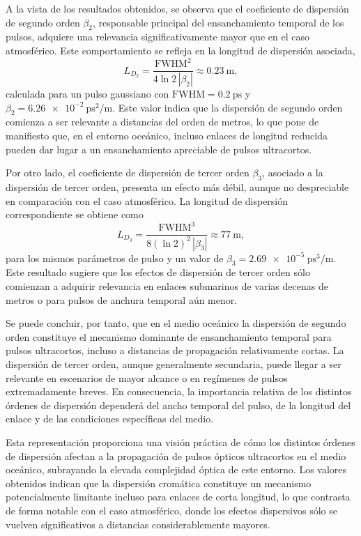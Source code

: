 A la vista de los resultados obtenidos, se observa que el coeficiente de dispersión de segundo orden $\beta_{2}$, responsable principal del ensanchamiento temporal de los pulsos, adquiere una relevancia significativamente mayor que en el caso atmosférico. Este comportamiento se refleja en la longitud de dispersión asociada,
\begin{equation}
L_{D_2}=\frac{\mathrm{FWHM}^2}{4\ln 2\,|\beta_{2}|}\approx \SI{0.23}{\meter},
\end{equation}
calculada para un pulso gaussiano con $\mathrm{FWHM}=\SI{0.2}{\pico\second}$ y $\beta_2=\SI{6.26e-2}{\pico\second\squared\per\meter}$. Este valor indica que la dispersión de segundo orden comienza a ser relevante a distancias del orden de metros, lo que pone de manifiesto que, en el entorno oceánico, incluso enlaces de longitud reducida pueden dar lugar a un ensanchamiento apreciable de pulsos ultracortos.

Por otro lado, el coeficiente de dispersión de tercer orden $\beta_{3}$, asociado a la dispersión de tercer orden, presenta un efecto más débil, aunque no despreciable en comparación con el caso atmosférico. La longitud de dispersión correspondiente se obtiene como
\begin{equation}
L_{D_3}=\frac{\mathrm{FWHM}^3}{8(\ln 2)^2\,|\beta_{3}|}\approx \SI{77}{\meter},
\end{equation}
para los mismos parámetros de pulso y un valor de $\beta_3=\SI{2.69e-5}{\pico\second\cubed\per\meter}$. Este resultado sugiere que los efectos de dispersión de tercer orden sólo comienzan a adquirir relevancia en enlaces submarinos de varias decenas de metros o para pulsos de anchura temporal aún menor.

Se puede concluir, por tanto, que en el medio oceánico la dispersión de segundo orden constituye el mecanismo dominante de ensanchamiento temporal para pulsos ultracortos, incluso a distancias de propagación relativamente cortas. La dispersión de tercer orden, aunque generalmente secundaria, puede llegar a ser relevante en escenarios de mayor alcance o en regímenes de pulsos extremadamente breves. En consecuencia, la importancia relativa de los distintos órdenes de dispersión dependerá del ancho temporal del pulso, de la longitud del enlace y de las condiciones específicas del medio.

Esta representación proporciona una visión práctica de cómo los distintos órdenes de dispersión afectan a la propagación de pulsos ópticos ultracortos en el medio oceánico, subrayando la elevada complejidad óptica de este entorno. Los valores obtenidos indican que la dispersión cromática constituye un mecanismo potencialmente limitante incluso para enlaces de corta longitud, lo que contrasta de forma notable con el caso atmosférico, donde los efectos dispersivos sólo se vuelven significativos a distancias considerablemente mayores.


